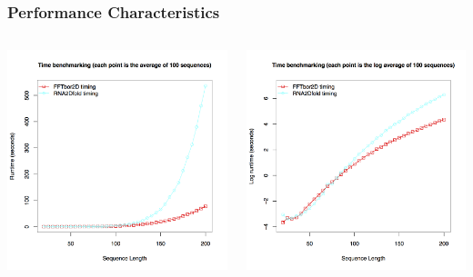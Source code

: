 \documentclass{beamer}
\begin{document}
\begin{frame}
  \frametitle{Performance Characteristics}
  \begin{columns}
  \includegraphics[width=\linewidth]{fft2dspeed.png}

  \includegraphics[width=\linewidth]{fft2dlogscale.png}

  \end{columns}
\end{frame}
\end{document}
